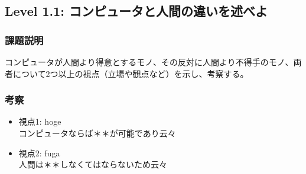\subsection{Level 1.1: コンピュータと人間の違いを述べよ}
\subsubsection{課題説明}
コンピュータが人間より得意とするモノ、その反対に人間より不得手のモノ、両者について2つ以上の視点（立場や観点など）を示し、考察する。

\subsubsection{考察}
\begin{itemize}
 \item 視点1: hoge\\
コンピュータならば＊＊が可能であり云々
 \item 視点2: fuga\\
人間は＊＊しなくてはならないため云々
\end{itemize}
